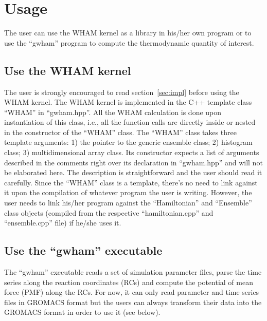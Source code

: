 \section{Usage} \label{sec:usage}
The user can use the WHAM kernel as a library in his/her own
program or to use the ``gwham'' program to compute the thermodynamic
quantity of interest. 

\subsection{Use the WHAM kernel}
The user is strongly encouraged to read section~\ref{sec:impl} before using the
WHAM kernel. The WHAM kernel is implemented in the C++ template class ``WHAM''
in ``gwham.hpp''. All the WHAM calculation is done upon instantiation of this
class, i.e., all the function calls are directly inside or nested in the
constructor of the ``WHAM'' class. The ``WHAM'' class takes three template
arguments: 1) the pointer to the generic ensemble class; 2) histogram class; 3)
multidimensional array class. Its constructor expects a list of arguments
described in the comments right over its declaration in ``gwham.hpp'' and will
not be elaborated here. The description is straightforward and the user should
read it carefully. Since the ``WHAM'' class is a template, there's no need to 
link against it upon the compilation of whatever program the user is writing. 
However, the user needs to link his/her program against the ``Hamiltonian'' 
and ``Ensemble'' class objects (compiled from the respective ``hamiltonian.cpp''
and ``ensemble.cpp'' file) if he/she uses it.

\subsection{Use the ``gwham'' executable}
The ``gwham'' executable reads a set of simulation parameter files, parse the
time series along the reaction coordinates (RCs) and compute the potential of
mean force (PMF) along the RCs. For now, it can only read parameter and 
time series files in GROMACS format but the users can always transform their 
data into the GROMACS format in order to use it (see below).

